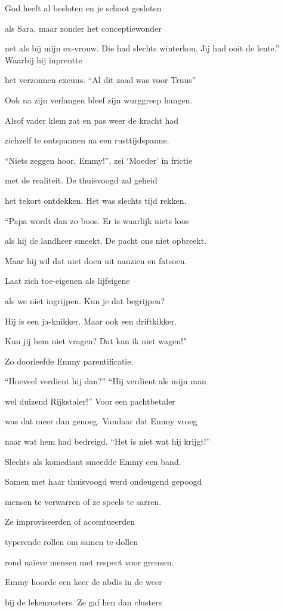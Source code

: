 God heeft al besloten
en je schoot gesloten

als Sara, maar zonder
het conceptiewonder

net als bij mijn ex-vrouw.
Die had slechts winterkou.
Jij had ooit de lente.”
Waarbij hij inprentte

het verzonnen excuus.
“Al dit zaad was voor Truus”

Ook na zijn verlangen
bleef zijn wurggreep hangen.

Alsof vader klem zat
en pas weer de kracht had

zichzelf te ontspannen
na een rusttijdspanne.

“Niets zeggen hoor, Emmy!”,
zei ‘Moeder’ in frictie

met de realiteit.
De thuisvoogd zal geheid

het tekort ontdekken.
Het was slechts tijd rekken.

“Papa wordt dan zo boos.
Er is waarlijk niets loos

als hij de landheer smeekt.
De pacht ons niet opbreekt.

Maar hij wil dat niet doen
uit aanzien en fatsoen.

Laat zich toe-eigenen
als lijfeigene

als we niet ingrijpen.
Kun je dat begrijpen?

Hij is een ja-knikker.
Maar ook een driftkikker.

Kun jij hem niet vragen?
Dat kan ik niet wagen!"

Zo doorleefde Emmy
parentificatie.

“Hoeveel verdient hij dan?”
“Hij verdient als mijn man

wel duizend Rijkstaler!”
Voor een pachtbetaler

was dat meer dan genoeg.
Vandaar dat Emmy vroeg

naar wat hem had bedreigd.
“Het is niet wat hij krijgt!”

Slechts als komediant
smeedde Emmy een band.

Samen met haar thuisvoogd
werd ondeugend gepoogd

mensen te verwarren
of ze speels te sarren.

Ze improviseerden
of accentueerden

typerende rollen
om samen te dollen

rond naïeve mensen
met respect voor grenzen.

Emmy hoorde een keer
de abdis in de weer

bij de lekenzusters.
Ze gaf hen dan clusters


